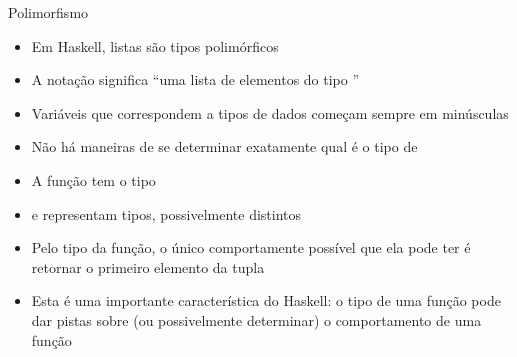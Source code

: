 \begin{frame}[fragile]{Polimorfismo}

    \begin{itemize}
        \item Em Haskell, listas são tipos polimórficos

        \item A notação  significa 
            ``uma lista de elementos do tipo ''
 
        \item Variáveis que correspondem a tipos de dados começam sempre em minúsculas

        \item Não há maneiras de se determinar exatamente qual é o tipo de 

        \item A função  tem o tipo 

        \item {} e  representam tipos, possivelmente distintos

        \item Pelo tipo da função, o único comportamente possível que ela pode ter é 
            retornar o primeiro elemento da tupla

        \item Esta é uma importante característica do Haskell: o tipo de uma função pode dar
            pistas sobre (ou possivelmente determinar) o comportamento de uma função
    \end{itemize}

\end{frame}

